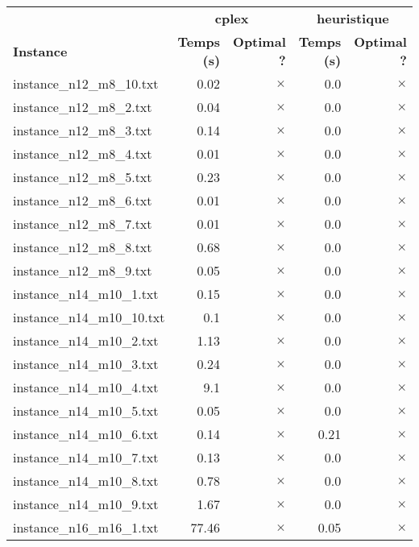 \documentclass{article}
\begin{document}
\newpage
\begin{center}
\renewcommand{\arraystretch}{1.4} 
 \begin{tabular}{lrrrr}
	\hline
 & \multicolumn{2}{c}{\textbf{cplex}} & \multicolumn{2}{c}{\textbf{heuristique}}\\
\textbf{Instance}  & \textbf{Temps (s)} & \textbf{Optimal ?}  & \textbf{Temps (s)} & \textbf{Optimal ?} \\\hline

instance\_n12\_m8\_10.txt & 0.02 & 
$\times$
 & 0.0 & 
$\times$
\\
instance\_n12\_m8\_2.txt & 0.04 & 
$\times$
 & 0.0 & 
$\times$
\\
instance\_n12\_m8\_3.txt & 0.14 & 
$\times$
 & 0.0 & 
$\times$
\\
instance\_n12\_m8\_4.txt & 0.01 & 
$\times$
 & 0.0 & 
$\times$
\\
instance\_n12\_m8\_5.txt & 0.23 & 
$\times$
 & 0.0 & 
$\times$
\\
instance\_n12\_m8\_6.txt & 0.01 & 
$\times$
 & 0.0 & 
$\times$
\\
instance\_n12\_m8\_7.txt & 0.01 & 
$\times$
 & 0.0 & 
$\times$
\\
instance\_n12\_m8\_8.txt & 0.68 & 
$\times$
 & 0.0 & 
$\times$
\\
instance\_n12\_m8\_9.txt & 0.05 & 
$\times$
 & 0.0 & 
$\times$
\\
instance\_n14\_m10\_1.txt & 0.15 & 
$\times$
 & 0.0 & 
$\times$
\\
instance\_n14\_m10\_10.txt & 0.1 & 
$\times$
 & 0.0 & 
$\times$
\\
instance\_n14\_m10\_2.txt & 1.13 & 
$\times$
 & 0.0 & 
$\times$
\\
instance\_n14\_m10\_3.txt & 0.24 & 
$\times$
 & 0.0 & 
$\times$
\\
instance\_n14\_m10\_4.txt & 9.1 & 
$\times$
 & 0.0 & 
$\times$
\\
instance\_n14\_m10\_5.txt & 0.05 & 
$\times$
 & 0.0 & 
$\times$
\\
instance\_n14\_m10\_6.txt & 0.14 & 
$\times$
 & 0.21 & 
$\times$
\\
instance\_n14\_m10\_7.txt & 0.13 & 
$\times$
 & 0.0 & 
$\times$
\\
instance\_n14\_m10\_8.txt & 0.78 & 
$\times$
 & 0.0 & 
$\times$
\\
instance\_n14\_m10\_9.txt & 1.67 & 
$\times$
 & 0.0 & 
$\times$
\\
instance\_n16\_m16\_1.txt & 77.46 & 
$\times$
 & 0.05 & 
$\times$
\\

\end{tabular}
\end{center}
\end{document}
